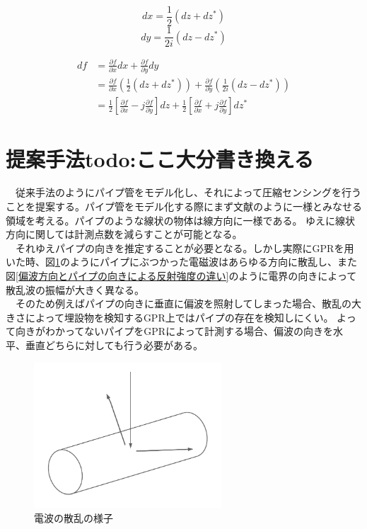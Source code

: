 \documentclass[12pt,a4paper]{jsreport}
\begin{document}
\begin{equation}
  dx=\frac{1}{2}(dz+dz^{*})
\end{equation}
\begin{equation}
  dy=\frac{1}{2i}(dz-dz^{*})
\end{equation}

\begin{equation}
  \begin{split}
  df
  &=\frac{\partial f}{\partial x}dx +  \frac{\partial f}{\partial y}dy
  \\
  &=\frac{\partial f}{\partial x}
  \left(
    \frac{1}{2}(dz+dz^{*})
  \right)
  +  \frac{\partial f}{\partial y}
  \left(
    \frac{1}{2i}(dz-dz^{*})
  \right)
  \\
  &=\frac{1}{2}
  \left[
    \frac{\partial f}{\partial x} - j \frac{\partial f}{\partial y}
  \right]dz+
  \frac{1}{2}
  \left[
    \frac{\partial f}{\partial x} + j \frac{\partial f}{\partial y}
  \right]dz^{*}
      \label{wirtinger}    
  \end{split}
  \end{equation}    

\section{提案手法todo:ここ大分書き換える}
　従来手法のようにパイプ管をモデル化し、それによって圧縮センシングを行うことを提案する。パイプ管をモデル化する際にまず文献\cite{imai}のように一様とみなせる領域を考える。パイプのような線状の物体は線方向に一様である。
ゆえに線状方向に関しては計測点数を減らすことが可能となる。
\\　それゆえパイプの向きを推定することが必要となる。しかし実際にGPRを用いた時、図\ref{電波の散乱の様子}のようにパイプにぶつかった電磁波はあらゆる方向に散乱し、また
図\ref{偏波方向とパイプの向きによる反射強度の違い}のように電界の向きによって散乱波の振幅が大きく異なる。
\\　そのため例えばパイプの向きに垂直に偏波を照射してしまった場合、散乱の大きさによって埋設物を検知するGPR上ではパイプの存在を検知しにくい。
よって向きがわかってないパイプをGPRによって計測する場合、偏波の向きを水平、垂直どちらに対しても行う必要がある。

\begin{figure}[h]
  \begin{center}
   \includegraphics[width=7cm]{./image/scattering.pdf}
  \caption{電波の散乱の様子}\label{電波の散乱の様子}
  \end{center}
  \end{figure}
\end{document}

